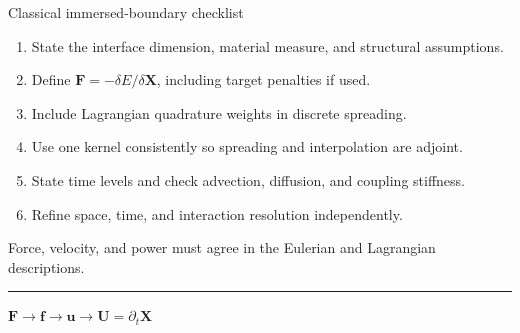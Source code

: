 \documentclass[aspectratio=169,11pt]{beamer}
\newcommand{\uvec}{\bm{u}}
\newcommand{\Xvec}{\bm{X}}
\newcommand{\Uvec}{\bm{U}}
\newcommand{\fvec}{\bm{f}}
\newcommand{\Fvec}{\bm{F}}
\begin{document}
\begin{frame}{Classical immersed-boundary checklist}
\begin{enumerate}\itemsep7pt
  \item State the interface dimension, material measure, and structural assumptions.
  \item Define \(\Fvec=-\delta E/\delta\Xvec\), including target penalties if used.
  \item Include Lagrangian quadrature weights in discrete spreading.
  \item Use one kernel consistently so spreading and interpolation are adjoint.
  \item State time levels and check advection, diffusion, and coupling stiffness.
  \item Refine space, time, and interaction resolution independently.
\end{enumerate}
\begin{punchbox}
\centering
\small Force, velocity, and power must agree in the Eulerian and Lagrangian descriptions.
\end{punchbox}
\end{frame}

\begin{frame}[plain]
\centering
\vfill
{\par}

\medskip
{\color{DarkGray}\rule{0.34\textwidth}{0.8pt}}

\vspace{1.7em}
{\Large
\(\Fvec\rightarrow\fvec\rightarrow\uvec\rightarrow\Uvec
=\partial_t\Xvec\)\par}
\vfill
\end{frame}
\end{document}
